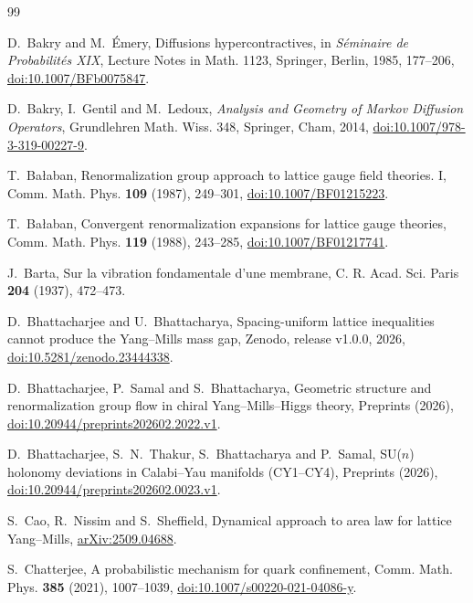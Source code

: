 \documentclass[11pt]{amsart}
\theoremstyle{definition}
\theoremstyle{remark}
\begin{document}
\begin{thebibliography}{99}

D.~Bakry and M.~\'Emery, Diffusions hypercontractives, in \emph{S\'eminaire
de Probabilit\'es XIX}, Lecture Notes in Math. 1123, Springer, Berlin, 1985,
177--206, \href{https://doi.org/10.1007/BFb0075847}{doi:10.1007/BFb0075847}.

D.~Bakry, I.~Gentil and M.~Ledoux, \emph{Analysis and Geometry of Markov
Diffusion Operators}, Grundlehren Math. Wiss. 348, Springer, Cham, 2014,
\href{https://doi.org/10.1007/978-3-319-00227-9}{doi:10.1007/978-3-319-00227-9}.

T.~Ba{\l}aban, Renormalization group approach to lattice gauge field theories.
I, Comm. Math. Phys. \textbf{109} (1987), 249--301,
\href{https://doi.org/10.1007/BF01215223}{doi:10.1007/BF01215223}.

T.~Ba{\l}aban, Convergent renormalization expansions for lattice gauge
theories, Comm. Math. Phys. \textbf{119} (1988), 243--285,
\href{https://doi.org/10.1007/BF01217741}{doi:10.1007/BF01217741}.

J.~Barta, Sur la vibration fondamentale d'une membrane, C. R. Acad. Sci.
Paris \textbf{204} (1937), 472--473.

D.~Bhattacharjee and U.~Bhattacharya, Spacing-uniform lattice inequalities
cannot produce the Yang--Mills mass gap, Zenodo, release v1.0.0, 2026,
\href{https://doi.org/10.5281/zenodo.23444338}{doi:10.5281/zenodo.23444338}.

D.~Bhattacharjee, P.~Samal and S.~Bhattacharya, Geometric structure and
renormalization group flow in chiral Yang--Mills--Higgs theory, Preprints
(2026), \href{https://doi.org/10.20944/preprints202602.2022.v1}
{doi:10.20944/preprints202602.2022.v1}.

D.~Bhattacharjee, S.~N.~Thakur, S.~Bhattacharya and P.~Samal, SU($n$)
holonomy deviations in Calabi--Yau manifolds (CY1--CY4), Preprints (2026),
\href{https://doi.org/10.20944/preprints202602.0023.v1}
{doi:10.20944/preprints202602.0023.v1}.

S.~Cao, R.~Nissim and S.~Sheffield, Dynamical approach to area law for lattice
Yang--Mills, \href{https://arxiv.org/abs/2509.04688}{arXiv:2509.04688}.

S.~Chatterjee, A probabilistic mechanism for quark confinement, Comm. Math.
Phys. \textbf{385} (2021), 1007--1039,
\href{https://doi.org/10.1007/s00220-021-04086-y}{doi:10.1007/s00220-021-04086-y}.


\end{thebibliography}
\end{document}
